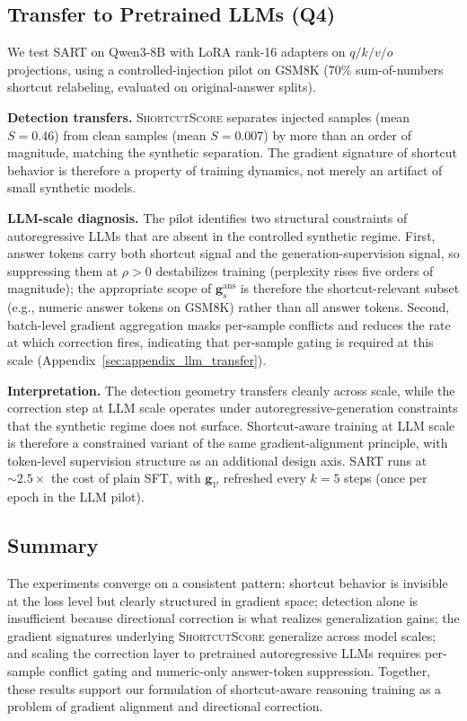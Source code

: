 \subsection{Transfer to Pretrained LLMs (Q4)}
\label{sec:exp_llm_transfer}

We test SART on Qwen3-8B with LoRA rank-16 adapters on $q/k/v/o$ projections, using a controlled-injection pilot on GSM8K (70\% sum-of-numbers shortcut relabeling, evaluated on original-answer splits).

\textbf{Detection transfers.} \textsc{ShortcutScore} separates injected samples (mean $S=0.46$) from clean samples (mean $S=0.007$) by more than an order of magnitude, matching the synthetic separation. The gradient signature of shortcut behavior is therefore a property of training dynamics, not merely an artifact of small synthetic models.

\textbf{LLM-scale diagnosis.} The pilot identifies two structural constraints of autoregressive LLMs that are absent in the controlled synthetic regime. First, answer tokens carry both shortcut signal and the generation-supervision signal, so suppressing them at $\rho>0$ destabilizes training (perplexity rises five orders of magnitude); the appropriate scope of $\mathbf{g}_s^{\mathrm{ans}}$ is therefore the shortcut-relevant subset (e.g., numeric answer tokens on GSM8K) rather than all answer tokens. Second, batch-level gradient aggregation masks per-sample conflicts and reduces the rate at which correction fires, indicating that per-sample gating is required at this scale (Appendix~\ref{sec:appendix_llm_transfer}).

\textbf{Interpretation.} The detection geometry transfers cleanly across scale, while the correction step at LLM scale operates under autoregressive-generation constraints that the synthetic regime does not surface. Shortcut-aware training at LLM scale is therefore a constrained variant of the same gradient-alignment principle, with token-level supervision structure as an additional design axis. SART runs at $\sim 2.5\times$ the cost of plain SFT, with $\mathbf{g}_{\mathcal{V}}$ refreshed every $k=5$ steps (once per epoch in the LLM pilot).

\subsection{Summary}

The experiments converge on a consistent pattern: shortcut behavior is invisible at the loss level but clearly structured in gradient space; detection alone is insufficient because directional correction is what realizes generalization gains; the gradient signatures underlying \textsc{ShortcutScore} generalize across model scales; and scaling the correction layer to pretrained autoregressive LLMs requires per-sample conflict gating and numeric-only answer-token suppression. Together, these results support our formulation of shortcut-aware reasoning training as a problem of gradient alignment and directional correction.
